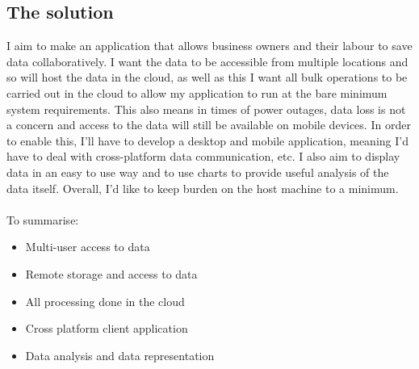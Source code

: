 \documentclass[a4paper,11pt]{proc}
\begin{document}
\subsection{The solution}
I aim to make an application that allows business owners and their labour to save data collaboratively. I want the data to be accessible from multiple locations and so will host the data in the cloud, as well as this I want all bulk operations to be carried out in the cloud to allow my application to run at the bare minimum system requirements. This also means in times of power outages, data loss is not a concern and access to the data will still be available on mobile devices. In order to enable this, I'll have to develop a desktop and mobile application, meaning I'd have to deal with cross-platform data communication, etc. I also aim to display data in an easy to use way and to use charts to provide useful analysis of the data itself. Overall, I'd like to keep burden on the host machine to a minimum.\\
\\To summarise:
\begin{itemize}
    \item Multi-user access to data
    \item Remote storage and access to data
    \item All processing done in the cloud
    \item Cross platform client application
    \item Data analysis and data representation
\end{itemize}
\end{document}
